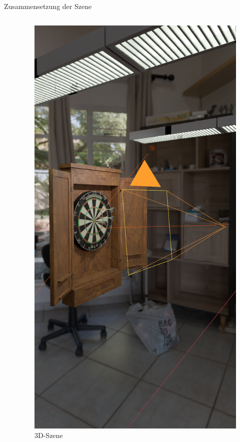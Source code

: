 \begin{frame}{Zusammensetzung der Szene}
\begin{columns}
\begin{column}{0.6\linewidth}
        \end{column}
        \begin{column}{0.4\linewidth}

            \begin{figure}
                \centering
                \includegraphics[height=0.75\textheight]{imgs/blender.png}
                \caption{3D-Szene}
            \end{figure}

        \end{column}
    \end{columns}

\end{frame}

